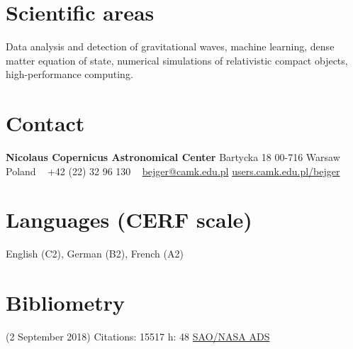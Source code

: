 \documentclass[]{friggeri-cv} %
\begin{document}


\begin{aside} %
\section{Scientific areas} 
Data analysis and detection of gravitational waves, machine learning, dense matter equation of state, numerical simulations of relativistic compact objects, high-performance computing.   
~
\section{Contact}
{\bf Nicolaus Copernicus Astronomical Center} 
Bartycka 18
00-716 Warsaw 
Poland
~
+42 (22) 32 96 130
~
\href{mailto:bejger@camk.edu.pl}{bejger@camk.edu.pl}
\href{http://users.camk.edu.pl/bejger}{users.camk.edu.pl/bejger}
~
\section{Languages {\small (CERF scale)}}
English (C2), German (B2), French (A2)
\section{Bibliometry} 
{\small (2 September 2018)}
Citations: 15517
h: 48
\href{http://adsabs.harvard.edu/cgi-bin/nph-abs_connect?db_key=AST&db_key=PHY&db_key=PRE&qform=AST&arxiv_sel=astro-ph&arxiv_sel=cond-mat&arxiv_sel=cs&arxiv_sel=gr-qc&arxiv_sel=hep-ex&arxiv_sel=hep-lat&arxiv_sel=hep-ph&arxiv_sel=hep-th&arxiv_sel=math&arxiv_sel=math-ph&arxiv_sel=nlin&arxiv_sel=nucl-ex&arxiv_sel=nucl-th&arxiv_sel=physics&arxiv_sel=quant-ph&arxiv_sel=q-bio&sim_query=YES&ned_query=YES&adsobj_query=YES&aut_logic=OR&obj_logic=OR&author=bejger\%2C+m.&object=&start_mon=&start_year=&end_mon=&end_year=&ttl_logic=OR&title=&txt_logic=OR&text=&nr_to_return=200&start_nr=1&jou_pick=ALL&ref_stems=&data_and=ALL&group_and=ALL&start_entry_day=&start_entry_mon=&start_entry_year=&end_entry_day=&end_entry_mon=&end_entry_year=&min_score=&sort=SCORE&data_type=SHORT&aut_syn=YES&ttl_syn=YES&txt_syn=YES&aut_wt=1.0&obj_wt=1.0&ttl_wt=0.3&txt_wt=3.0&aut_wgt=YES&obj_wgt=YES&ttl_wgt=YES&txt_wgt=YES&ttl_sco=YES&txt_sco=YES&version=1}{SAO/NASA ADS}
\end{aside}
\end{document}
